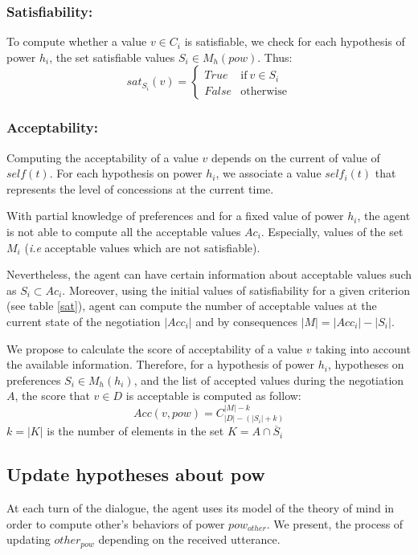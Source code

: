 \documentclass[sigconf]{aamas}  %
\begin{document}
	\subsubsection{Satisfiability:}
	To compute whether a value $v \in C_i$ is satisfiable, we check for each hypothesis of power $h_i$, the set satisfiable values $S_i \in M_h(pow)$.
	Thus: 
	\begin{equation}
	sat_{S_i}(v)= \left\{\begin{array}{ll}
	True	 & \mathrm{if\ }  v \in S_i\\
	False & \mathrm{otherwise}
	\end{array}\right.
	\end{equation}
	
	\subsubsection{Acceptability:}
	Computing the acceptability of a value $v$ depends on the current of value of $self(t)$. For each hypothesis on power $h_i$, we associate a value $self_i(t)$ that represents the level of concessions at the current time. 
	
	With partial knowledge of preferences and for a fixed value of power $h_i$, the agent is not able to compute all the acceptable values $Ac_i$. Especially,   values of the set $M_i$ (\emph{i.e} acceptable values which are not satisfiable). 
	
	Nevertheless, the agent can have certain information about acceptable values such as $ S_i \subset Ac_i$. Moreover, using the initial values of satisfiability for a given criterion (see table \ref{sat}), agent can compute the number of acceptable values at the current state of the negotiation $|Acc_i|$ and by consequences $|M| = |Acc_i| - |S_i|$. 
	
	We propose to calculate the score of acceptability of a value $v$ taking into account the available information. Therefore, for a hypothesis of power $h_i$, hypotheses on preferences $S_i \in M_h(h_i)$,  and the list of accepted values during the negotiation $A$, the score that $v \in D$ is acceptable is computed as follow: 
	\begin{equation}
	Acc(v, pow) = C_{|D|-(|S_i| + k)}^{|M| - k}
	\end{equation}
	$k = |K| $ is the number of elements in the set $K = A \cap \overline S_i$
	
	
	
	\subsection{Update hypotheses about pow}
	At each turn of the dialogue, the agent uses its model of the theory of mind in order to compute other's behaviors of power $pow_{other}$. We present, the process of updating $other_{pow}$ depending on the received utterance. 
\end{document}
